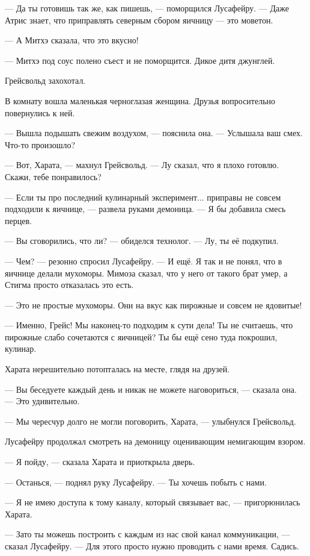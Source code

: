 --- Да ты готовишь так же, как пишешь, --- поморщился Лусафейру.
--- Даже Атрис знает, что приправлять северным сбором яичницу --- это моветон.

--- А Митхэ сказала, что это вкусно!

--- Митхэ под соус полено съест и не поморщится.
Дикое дитя джунглей.

Грейсвольд захохотал.

В комнату вошла маленькая черноглазая женщина.
Друзья вопросительно повернулись к ней.

--- Вышла подышать свежим воздухом, --- пояснила она.
--- Услышала ваш смех.
Что-то произошло?

--- Вот, Харата, --- махнул Грейсвольд.
--- Лу сказал, что я плохо готовлю.
Скажи, тебе понравилось?

--- Если ты про последний кулинарный эксперимент... приправы не совсем подходили к яичнице, --- развела руками демоница.
--- Я бы добавила смесь перцев.

--- Вы сговорились, что ли? --- обиделся технолог.
--- Лу, ты её подкупил.

--- Чем? --- резонно спросил Лусафейру.
--- И ещё.
Я так и не понял, что в яичнице делали мухоморы.
Мимоза сказал, что у него от такого брат умер, а Стигма просто отказалась это есть.

--- Это не простые мухоморы.
Они на вкус как пирожные и совсем не ядовитые!

--- Именно, Грейс!
Мы наконец-то подходим к сути дела!
Ты не считаешь, что пирожные слабо сочетаются с яичницей?
Ты бы ещё сено туда покрошил, кулинар.

Харата нерешительно потопталась на месте, глядя на друзей.

--- Вы беседуете каждый день и никак не можете наговориться, --- сказала она.
--- Это удивительно.

--- Мы чересчур долго не могли поговорить, Харата, --- улыбнулся Грейсвольд.

Лусафейру продолжал смотреть на демоницу оценивающим немигающим взором.

--- Я пойду, --- сказала Харата и приоткрыла дверь.

--- Останься, --- поднял руку Лусафейру.
--- Ты хочешь побыть с нами.

--- Я не имею доступа к тому каналу, который связывает вас, --- пригорюнилась Харата.

--- Зато ты можешь построить с каждым из нас свой канал коммуникации, --- сказал Лусафейру.
--- Для этого просто нужно проводить с нами время.
Садись.

